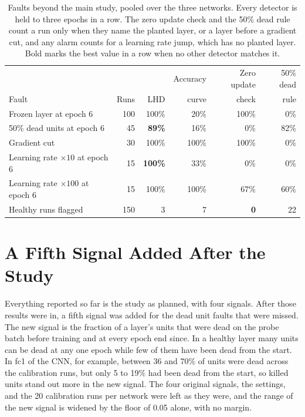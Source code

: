 \documentclass[11pt]{article}
\begin{document}
\begin{table}[t]
\centering
\small
\caption{Faults beyond the main study, pooled over the three networks. Every detector is held to three epochs in a row. The zero update check and the 50\% dead rule count a run only when they name the planted layer, or a layer before a gradient cut, and any alarm counts for a learning rate jump, which has no planted layer. Bold marks the best value in a row when no other detector matches it.}
\label{tab:extra}
\begin{tabular}{@{}lrrrrr@{}}
\toprule
 & & & Accuracy & Zero update & 50\% dead \\
Fault & Runs & LHD & curve & check & rule \\
\midrule
Frozen layer at epoch 6 & 100 & 100\% & 20\% & 100\% & 0\% \\
50\% dead units at epoch 6 & 45 & \textbf{89\%} & 16\% & 0\% & 82\% \\
Gradient cut & 30 & 100\% & 100\% & 100\% & 0\% \\
Learning rate $\times 10$ at epoch 6 & 15 & \textbf{100\%} & 33\% & 0\% & 0\% \\
Learning rate $\times 100$ at epoch 6 & 15 & 100\% & 100\% & 67\% & 60\% \\
\midrule
Healthy runs flagged & 150 & 3 & 7 & \textbf{0} & 22 \\
\bottomrule
\end{tabular}
\end{table}

\section{A Fifth Signal Added After the Study}
\label{sec:v2}

Everything reported so far is the study as planned, with four signals. After those results were in, a fifth signal was added for the dead unit faults that were missed. The new signal is the fraction of a layer's units that were dead on the probe batch before training and at every epoch end since. In a healthy layer many units can be dead at any one epoch while few of them have been dead from the start. In fc1 of the CNN, for example, between 36 and 70\% of units were dead across the calibration runs, but only 5 to 19\% had been dead from the start, so killed units stand out more in the new signal. The four original signals, the settings, and the 20 calibration runs per network were left as they were, and the range of the new signal is widened by the floor of 0.05 alone, with no margin.
\end{document}
